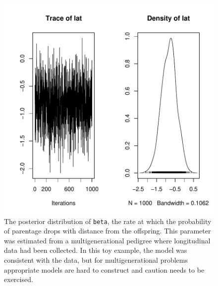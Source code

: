 \documentclass{article}
\begin{document}
\begin{figure}[!h]
\begin{center}
\includegraphics{Tutorial-090}
\end{center}
\caption{The posterior distribution of \texttt{beta}, the rate at which the probability of parentage drops with distance from the offspring.  This parameter was estimated from a multigenerational pedigree where longitudinal data had been collected.  In this toy example, the model was consistent with the data, but for multigenerational problems appropriate models are hard to construct and caution needs to be exercised.}
\label{MGped}
\end{figure}
\end{document}
